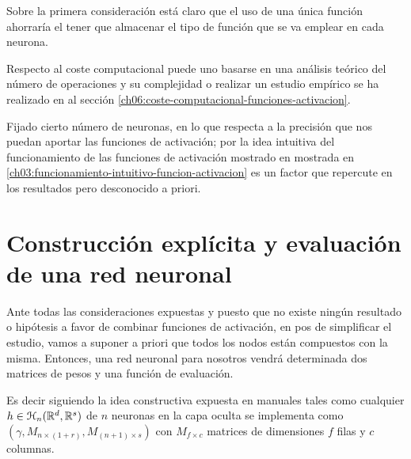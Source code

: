 Sobre la primera consideración está claro que el uso de una única función ahorraría el tener que almacenar el tipo de función que se va emplear en cada neurona.

Respecto al coste computacional puede uno basarse en una análisis teórico del número de 
operaciones y su complejidad o realizar un estudio empírico se ha realizado 
en al sección \ref{ch06:coste-computacional-funciones-activacion}.

Fijado cierto número de neuronas, en lo que respecta a la precisión que nos puedan aportar las funciones de activación; por la idea intuitiva 
del funcionamiento de las funciones de activación mostrado en mostrada en \ref{ch03:funcionamiento-intuitivo-funcion-activacion} es un factor que repercute en los resultados 
pero desconocido a priori. 



\section{Construcción explícita y evaluación de una red neuronal}
\label{ch05:construction-evaluation-nnnn}
Ante todas las consideraciones expuestas y puesto que 
no existe ningún resultado o hipótesis a favor de combinar funciones de activación, en pos de simplificar el estudio, vamos a suponer a priori que todos los nodos están compuestos con la misma. Entonces,  una red neuronal para nosotros 
vendrá determinada dos matrices de pesos y una función de evaluación. 

Es decir siguiendo la idea constructiva expuesta en manuales tales como \cite{learning-from-data-1-2}
 cualquier $h \in \mathcal{H}_n(\mathbb{R}^d,\mathbb{R}^s)$ de $n$ neuronas en la capa oculta se implementa como 
$(\gamma, M_{n \times (1+r)}, M_{(n+1) \times s})$ con $M_{f \times c}$ matrices de dimensiones $f$ filas y $c$ columnas. 

